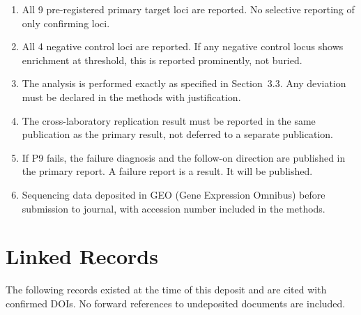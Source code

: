 \documentclass[10pt, a4paper]{article}
\begin{document}
\begin{enumerate}[itemsep=0.2em]
  \item All 9 pre-registered primary target
    loci are reported. No selective reporting
    of only confirming loci.

  \item All 4 negative control loci are
    reported. If any negative control locus
    shows enrichment at threshold, this is
    reported prominently, not buried.

  \item The analysis is performed exactly as
    specified in Section~3.3. Any deviation
    must be declared in the methods with
    justification.

  \item The cross-laboratory replication
    result must be reported in the same
    publication as the primary result, not
    deferred to a separate publication.

  \item If P9 fails, the failure diagnosis
    and the follow-on direction are published
    in the primary report. A failure report
    is a result. It will be published.

  \item Sequencing data deposited in GEO
    (Gene Expression Omnibus) before
    submission to journal, with accession
    number included in the methods.
\end{enumerate}

\section{Linked Records}
\label{sec:linked}

The following records existed at the time
of this deposit and are cited with confirmed
DOIs. No forward references to undeposited
documents are included.
\end{document}
